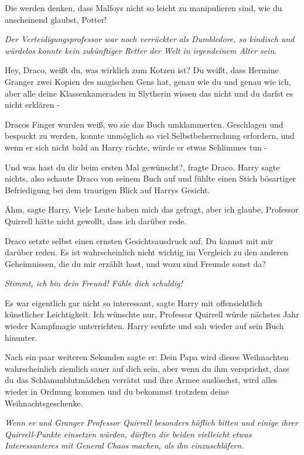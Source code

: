 \glqq{}Die werden denken, dass Malfoys nicht so leicht zu manipulieren sind, wie
du anscheinend glaubst, Potter!\grqq{}

\emph{Der Verteidigungsprofessor war noch verrückter als Dumbledore, so
kindisch und würdelos konnte kein zukünftiger Retter der Welt in irgendeinem
Alter sein.}

\glqq{}Hey, Draco, weißt du, was wirklich zum Kotzen ist? Du weißt, dass Hermine
Granger zwei Kopien des magischen Gens hat, genau wie du und genau wie ich, aber
alle deine Klassenkameraden in Slytherin wissen das nicht und du darfst es nicht
erklären -\grqq{}

Dracos Finger wurden weiß, wo sie das Buch umklammerten. Geschlagen und bespuckt
zu werden, konnte unmöglich so viel Selbstbeherrschung erfordern, und wenn er
sich nicht bald an Harry rächte, würde er etwas Schlimmes tun -

\glqq{}Und was hast du dir beim ersten Mal gewünscht?\grqq{}, fragte Draco. Harry
sagte nichts, also schaute Draco von seinem Buch auf und fühlte einen Stich
bösartiger Befriedigung bei dem traurigen Blick auf Harrys Gesicht.

\glqq{}Ähm\grqq{}, sagte Harry. \glqq{}Viele Leute haben mich das gefragt, aber
ich glaube, Professor Quirrell hätte nicht gewollt, dass ich darüber rede.\grqq{}

Draco setzte selbst einen ernsten Gesichtsausdruck auf. \glqq{}Du kannst mit mir
darüber reden. Es ist wahrscheinlich nicht wichtig im Vergleich zu den anderen
Geheimnissen, die du mir erzählt hast, und wozu sind Freunde sonst da?\grqq{}

\emph{Stimmt, ich bin dein Freund! Fühle dich schuldig!}

\glqq{}Es war eigentlich gar nicht so interessant\grqq{}, sagte Harry mit
offensichtlich künstlicher Leichtigkeit. \glqq{}Ich wünschte nur, Professor
Quirrell würde nächstes Jahr wieder Kampfmagie unterrichten.\grqq{} Harry seufzte und
sah wieder auf sein Buch hinunter.

Nach ein paar weiteren Sekunden sagte er: \glqq{}Dein Papa wird dieses
Weihnachten wahrscheinlich ziemlich sauer auf dich sein, aber wenn du ihm
versprichst, dass du das Schlammblutmädchen verrätst und ihre Armee auslöschst,
wird alles wieder in Ordnung kommen und du bekommst trotzdem deine
Weihnachtsgeschenke.\grqq{}

\emph{Wenn er und Granger Professor Quirrell besonders höflich bitten und
einige ihrer Quirrell-Punkte einsetzen würden, dürften die beiden vielleicht
etwas Interessanteres mit General Chaos machen, als ihn einzuschläfern.}

